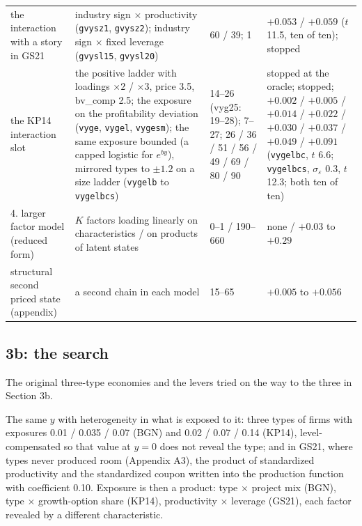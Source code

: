 \begin{center}
\begin{tabular}{p{4.3cm}p{5.4cm}p{2.4cm}p{3.2cm}}
the interaction with a story in GS21 & industry sign $\times$ productivity (\texttt{gvysz1}, \texttt{gvysz2}); industry sign $\times$ fixed leverage (\texttt{gvysl15}, \texttt{gvysl20}) & 60 / 39; 1 & $+0.053$ / $+0.059$ ($t$ 11.5, ten of ten); stopped \\
the KP14 interaction slot & the positive ladder with loadings $\times2$ / $\times3$, price 3.5, bv\_comp 2.5; the exposure on the profitability deviation (\texttt{vyge}, \texttt{vygel}, \texttt{vygesm}); the same exposure bounded (a capped logistic for $e^{by}$), mirrored types to $\pm1.2$ on a size ladder (\texttt{vygelb} to \texttt{vygelbcs}) & 14--26 (vyg25: 19--28); 7--27; 26 / 36 / 51 / 56 / 49 / 69 / 80 / 90 & stopped at the oracle; stopped; $+0.002$ / $+0.005$ / $+0.014$ / $+0.022$ / $+0.030$ / $+0.037$ / $+0.049$ / $+0.091$ (\texttt{vygelbc}, $t$ 6.6; \texttt{vygelbcs}, $\sigma_\varepsilon$ 0.3, $t$ 12.3; both ten of ten) \\
4. larger factor model (reduced form) & $K$ factors loading linearly on characteristics / on products of latent states & 0--1 / 190--660 & none / $+0.03$ to $+0.29$ \\
structural second priced state (appendix) & a second chain in each model & 15--65 & $+0.005$ to $+0.056$ \\\hline
\end{tabular}
\end{center}

\subsection*{3b: the search}
The original three-type economies and the levers tried on the way to the three in Section 3b.

The same $y$ with heterogeneity in what is exposed to it: three types of firms with exposures 0.01 / 0.035 / 0.07 (BGN) and 0.02 / 0.07 / 0.14 (KP14), level-compensated so that value at $y=0$ does not reveal the type; and in GS21, where types never produced room (Appendix A3), the product of standardized productivity and the standardized coupon written into the production function with coefficient 0.10. Exposure is then a product: type $\times$ project mix (BGN), type $\times$ growth-option share (KP14), productivity $\times$ leverage (GS21), each factor revealed by a different characteristic.


